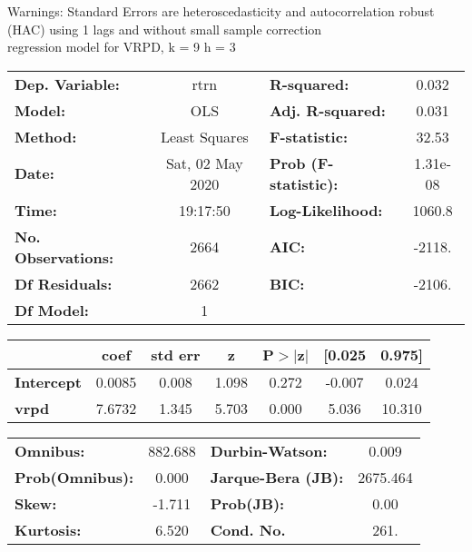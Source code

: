 Warnings: \newline
 [1] Standard Errors are heteroscedasticity and autocorrelation robust (HAC) using 1 lags and without small sample correction\\ 

regression model for VRPD, k = 9 h = 3\begin{center}
\begin{tabular}{lclc}
\toprule
\textbf{Dep. Variable:}    &       rtrn       & \textbf{  R-squared:         } &     0.032   \\
\textbf{Model:}            &       OLS        & \textbf{  Adj. R-squared:    } &     0.031   \\
\textbf{Method:}           &  Least Squares   & \textbf{  F-statistic:       } &     32.53   \\
\textbf{Date:}             & Sat, 02 May 2020 & \textbf{  Prob (F-statistic):} &  1.31e-08   \\
\textbf{Time:}             &     19:17:50     & \textbf{  Log-Likelihood:    } &    1060.8   \\
\textbf{No. Observations:} &        2664      & \textbf{  AIC:               } &    -2118.   \\
\textbf{Df Residuals:}     &        2662      & \textbf{  BIC:               } &    -2106.   \\
\textbf{Df Model:}         &           1      & \textbf{                     } &             \\
\bottomrule
\end{tabular}
\begin{tabular}{lcccccc}
                   & \textbf{coef} & \textbf{std err} & \textbf{z} & \textbf{P$> |$z$|$} & \textbf{[0.025} & \textbf{0.975]}  \\
\midrule
\textbf{Intercept} &       0.0085  &        0.008     &     1.098  &         0.272        &       -0.007    &        0.024     \\
\textbf{vrpd}      &       7.6732  &        1.345     &     5.703  &         0.000        &        5.036    &       10.310     \\
\bottomrule
\end{tabular}
\begin{tabular}{lclc}
\textbf{Omnibus:}       & 882.688 & \textbf{  Durbin-Watson:     } &    0.009  \\
\textbf{Prob(Omnibus):} &   0.000 & \textbf{  Jarque-Bera (JB):  } & 2675.464  \\
\textbf{Skew:}          &  -1.711 & \textbf{  Prob(JB):          } &     0.00  \\
\textbf{Kurtosis:}      &   6.520 & \textbf{  Cond. No.          } &     261.  \\
\bottomrule
\end{tabular}
\end{center}

